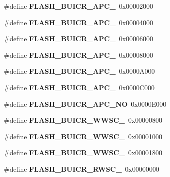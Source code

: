 \begin{DoxyCompactItemize}
\#define {\bfseries F\+L\+A\+S\+H\+\_\+\+B\+U\+I\+C\+R\+\_\+\+A\+P\+C\+\_}~0x00002000
\item 
\mbox{\label{reg-defs_8h_a344645edc0c5656246e279267ae2bbe0}} 
\#define {\bfseries F\+L\+A\+S\+H\+\_\+\+B\+U\+I\+C\+R\+\_\+\+A\+P\+C\+\_}~0x00004000
\item 
\mbox{\label{reg-defs_8h_a893cbfaec3ef5fcc1817ce7b51432217}} 
\#define {\bfseries F\+L\+A\+S\+H\+\_\+\+B\+U\+I\+C\+R\+\_\+\+A\+P\+C\+\_}~0x00006000
\item 
\mbox{\label{reg-defs_8h_ac0bdafa03768d1c4c8dba0ff41414e65}} 
\#define {\bfseries F\+L\+A\+S\+H\+\_\+\+B\+U\+I\+C\+R\+\_\+\+A\+P\+C\+\_}~0x00008000
\item 
\mbox{\label{reg-defs_8h_af3ac3a9e5016df12c13a4fb770081dff}} 
\#define {\bfseries F\+L\+A\+S\+H\+\_\+\+B\+U\+I\+C\+R\+\_\+\+A\+P\+C\+\_}~0x0000\+A000
\item 
\mbox{\label{reg-defs_8h_a48af0cb876518186446010bf34d80c39}} 
\#define {\bfseries F\+L\+A\+S\+H\+\_\+\+B\+U\+I\+C\+R\+\_\+\+A\+P\+C\+\_}~0x0000\+C000
\item 
\mbox{\label{reg-defs_8h_addebd471c0b2c39980bd1fcdfcc26bfd}} 
\#define {\bfseries F\+L\+A\+S\+H\+\_\+\+B\+U\+I\+C\+R\+\_\+\+A\+P\+C\+\_\+\+NO}~0x0000\+E000
\item 
\mbox{\label{reg-defs_8h_a914a86a8e3044cf3a1d3d45ffb3f2b89}} 
\#define {\bfseries F\+L\+A\+S\+H\+\_\+\+B\+U\+I\+C\+R\+\_\+\+W\+W\+S\+C\+\_}~0x00000800
\item 
\mbox{\label{reg-defs_8h_acecd8802efa3b7701703c8a50c0468d8}} 
\#define {\bfseries F\+L\+A\+S\+H\+\_\+\+B\+U\+I\+C\+R\+\_\+\+W\+W\+S\+C\+\_}~0x00001000
\item 
\mbox{\label{reg-defs_8h_a531f1eca26de9e854c4f90ca66abd9aa}} 
\#define {\bfseries F\+L\+A\+S\+H\+\_\+\+B\+U\+I\+C\+R\+\_\+\+W\+W\+S\+C\+\_}~0x00001800
\item 
\mbox{\label{reg-defs_8h_a3cea1eea1069996fd81a052c6f255431}} 
\#define {\bfseries F\+L\+A\+S\+H\+\_\+\+B\+U\+I\+C\+R\+\_\+\+R\+W\+S\+C\+\_}~0x00000000

\end{DoxyCompactItemize}
